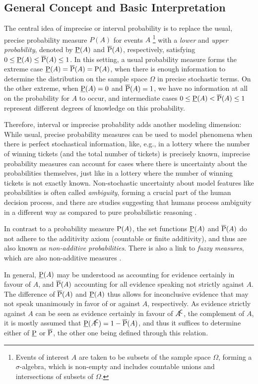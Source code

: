 \subsection{General Concept and Basic Interpretation}
\label{sec:ip-general}

The central idea of imprecise or interval probability \parencite{2011:IESS-ip, 1991:walley, 2001:weichselberger} is
to replace the usual, precise probability measure $P(A)$ for events $A$%
\footnote{Events of interest $A$ are taken to be subsets of the sample space $\Omega$,
forming a $\sigma$-algebra, which is non-empty and includes countable unions and intersections of subsets of $\Omega$.}
with a \emph{lower} and \emph{upper probability}, denoted by $\underline{\operatorname{P}}(A)$ and $\overline{\operatorname{P}}(A)$, respectively,
satisfying $0 \le \underline{\operatorname{P}}(A) \le \overline{\operatorname{P}}(A) \le 1$.
In this setting, a usual probability measure forms the extreme case $\underline{\operatorname{P}}(A) = \overline{\operatorname{P}}(A) = \operatorname{P}(A)$,
when there is enough information to determine the distribution on the sample space $\Omega$
in precise stochastic terms.
On the other extreme, when $\underline{\operatorname{P}}(A) = 0$ and $\overline{\operatorname{P}}(A) = 1$,
we have no information at all on the probability for $A$ to occur,
and intermediate cases $0 \le \underline{\operatorname{P}}(A) < \overline{\operatorname{P}}(A) \le 1$ represent
different degrees of knowledge on this probability.

Therefore, interval or imprecise probability adds another modeling dimension:
While usual, precise probability measures can be used to model phenomena when there is perfect stochastical information,
like, e.g., in a lottery where the number of winning tickets (and the total number of tickets) is precisely known,
imprecise probability measures can account for cases where there is uncertainty about the probabilities themselves,
just like in a lottery where the number of winning tickets is not exactly known.
Non-stochastic uncertainty about model features like probabilities is often called \emph{ambiguity},
forming a crucial part of the human decision process,
and there are studies suggesting that humans process ambiguity in a different way
as compared to pure probabilistic reasoning \parencite{2005:hsu-bhatt}.

In contrast to a probability measure $\operatorname{P}(A)$,
the set functions $\underline{\operatorname{P}}(A)$ and $\overline{\operatorname{P}}(A)$ do not adhere
to the additivity axiom (countable or finite additivity),
and thus are also known as \emph{non-additive probabilities}.
There is also a link to \emph{fuzzy measures}, which are also non-additive measures
\parencite[see, e.g.,][]{1997:denneberg}.

In general, $\underline{\operatorname{P}}(A)$ may be understood as accounting for evidence certainly in favour of $A$,
and $\overline{\operatorname{P}}(A)$ accounting for all evidence speaking not strictly against $A$.
The difference of $\overline{\operatorname{P}}(A)$ and $\underline{\operatorname{P}}(A)$ thus allows for inconclusive evidence
that may not speak unanimously in favor of or against $A$, respectively.
As evidence strictly against $A$ can be seen as evidence certainly in favour of $A^{{\mbox{\!\scriptsize\textsf{C}}}}$,
the complement of $A$,
it is mostly assumed that $\underline{\operatorname{P}}(A^{{\mbox{\!\scriptsize\textsf{C}}}}) = 1 - \overline{\operatorname{P}}(A)$,
and thus it suffices to determine either of $\underline{\operatorname{P}}$ or $\overline{\operatorname{P}}$,
the other one being defined through this relation.

